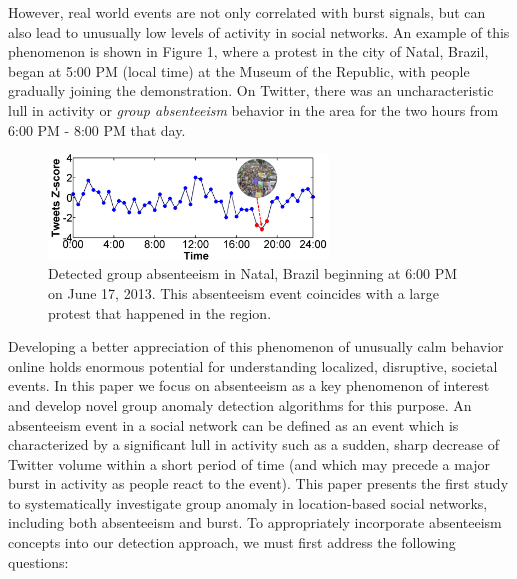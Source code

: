 \documentclass[twoside,leqno,twocolumn]{article}
\begin{document}
However, real world events are not only correlated with burst signals, but can also lead to unusually low levels of activity in social networks. An example of this phenomenon
is shown in Figure 1, where a protest in the city of Natal, Brazil, began at 5:00 PM (local time) at the Museum of the Republic, with people gradually joining the demonstration. %
On Twitter, there was an uncharacteristic lull in activity or {\it group absenteeism} behavior in the area for the two hours from 6:00 PM - 8:00 PM that day.

\begin{figure}[t]
\centering
\includegraphics[height=1.1in]{figures/Natal_example1.png}
\caption{Detected group absenteeism in Natal, Brazil beginning at 6:00 PM on June 17, 2013. This absenteeism event coincides with a large protest that happened in the region.}
\label{fig:natal-protest}
\end{figure}

Developing a better appreciation of this phenomenon of unusually calm behavior online holds enormous potential for understanding localized, disruptive, societal events. In this paper we focus on absenteeism as a key phenomenon of interest and develop novel group anomaly detection algorithms for this purpose.
An absenteeism event in a social network can be defined as an event which is characterized by a significant lull in activity such as a sudden, sharp decrease of Twitter volume within a short period of time (and which may precede a major burst in activity as people react to the event). This paper presents the first study to systematically investigate group anomaly in location-based social networks, including both absenteeism and burst. To appropriately incorporate absenteeism concepts into our detection approach, we must first address the following questions:
\end{document}
